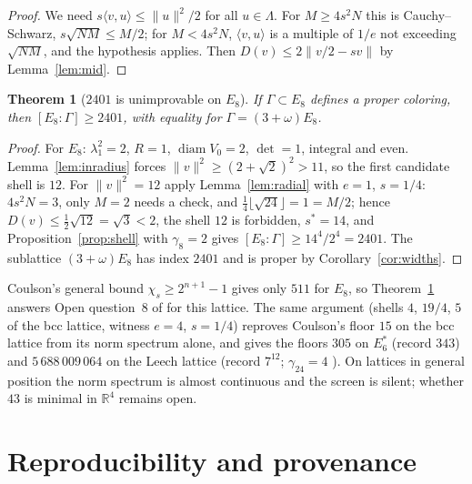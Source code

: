 \documentclass[10pt]{article}
\theoremstyle{plain}
\newtheorem{theorem}{Theorem}[section]
\theoremstyle{remark}
\newcommand{\R}{\mathbb{R}}
\newcommand{\diam}{\operatorname{diam}}
\begin{document}
\begin{proof}
We need $s\langle v,u\rangle\le\|u\|^2/2$ for all $u\in\Lambda$. For
$M\ge4s^2N$ this is Cauchy--Schwarz, $s\sqrt{NM}\le M/2$; for $M<4s^2N$,
$\langle v,u\rangle$ is a multiple of $1/e$ not exceeding $\sqrt{NM}$, and
the hypothesis applies. Then $D(v)\le2\|v/2-sv\|$ by Lemma~\ref{lem:mid}.
\end{proof}

\begin{theorem}[$2401$ is unimprovable on $E_8$]\label{thm:e8}
If $\Gamma\subset E_8$ defines a proper coloring, then $[E_8:\Gamma]\ge2401$,
with equality for $\Gamma=(3+\omega)E_8$.
\end{theorem}

\begin{proof}
For $E_8$: $\lambda_1^2=2$, $R=1$, $\diam V_0=2$, $\det=1$, integral and even.
Lemma~\ref{lem:inradius} forces $\|v\|^2\ge(2+\sqrt2)^2>11$, so the first
candidate shell is $12$. For $\|v\|^2=12$ apply Lemma~\ref{lem:radial} with
$e=1$, $s=1/4$: $4s^2N=3$, only $M=2$ needs a check, and
$\frac14\lfloor\sqrt{24}\rfloor=1=M/2$; hence
$D(v)\le\frac12\sqrt{12}=\sqrt3<2$, the shell $12$ is forbidden, $s^*=14$,
and Proposition~\ref{prop:shell} with $\gamma_8=2$ \cite{Blichfeldt} gives
$[E_8:\Gamma]\ge14^4/2^4=2401$. The sublattice $(3+\omega)E_8$ has index
$2401$ and is proper by Corollary~\ref{cor:widths}.
\end{proof}

Coulson's general bound $\chi_s\ge2^{n+1}-1$ \cite{Coulson,ABPR} gives only
$511$ for $E_8$, so Theorem~\ref{thm:e8} answers Open question~8 of
\cite{ABPR} for this lattice. The same argument (shells $4$, $19/4$, $5$ of
the bcc lattice, witness $e=4$, $s=1/4$) reproves Coulson's floor $15$ on the
bcc lattice from its norm spectrum alone, and gives the floors $305$ on
$E_6^*$ (record $343$) and $5\,688\,009\,064$ on the Leech lattice (record
$7^{12}$; $\gamma_{24}=4$ \cite{CohnKumar}). On lattices in general position
the norm spectrum is almost continuous and the screen is silent; whether
$43$ is minimal in $\R^4$ remains open.

\section{Reproducibility and provenance}\label{sec:repro}
\end{document}

